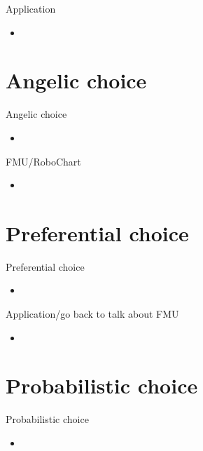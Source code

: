 \documentclass[%
    slidestop,%
    compress,%
    mathserif,%
    table,%
    usenames,%
    aspectratio=169,
    dvipsnames,%
]{beamer}%
\begin{document}
\begin{frame}{Application}
    \begin{itemize}
        \item 
    \end{itemize}
\end{frame}

\section{Angelic choice}
\begin{frame}{Angelic choice}
    \begin{itemize}
        \item 
    \end{itemize}
\end{frame}

\begin{frame}{FMU/RoboChart}
    \begin{itemize}
        \item 
    \end{itemize}
\end{frame}

\section{Preferential choice}
\begin{frame}{Preferential choice}
    \begin{itemize}
        \item 
    \end{itemize}
\end{frame}

\begin{frame}{Application/go back to talk about FMU}
    \begin{itemize}
        \item 
    \end{itemize}
\end{frame}

\section{Probabilistic choice}
\begin{frame}{Probabilistic choice}
    \begin{itemize}
        \item 
    \end{itemize}
\end{frame}
\end{document}
